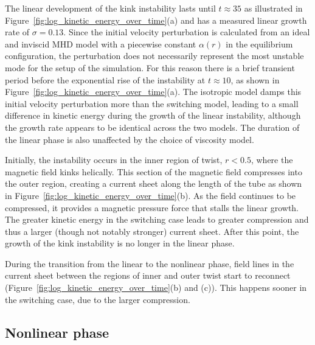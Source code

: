 The linear development of the kink instability lasts until $t\approx 35$ as illustrated in   Figure~\ref{fig:log_kinetic_energy_over_time}(a) and has a measured linear growth rate of $\sigma = 0.13$. Since the initial velocity perturbation is calculated from an ideal and inviscid MHD model with a piecewise constant $\alpha(r)$ in the equilibrium configuration, the perturbation does not necessarily represent the most unstable mode for the setup of the simulation. For this reason there is a brief transient period before the exponential rise of the instability at $t\approx10$, as shown in Figure~\ref{fig:log_kinetic_energy_over_time}(a). The isotropic model damps this initial velocity perturbation more than the switching model, leading to a small difference in kinetic energy during the growth of the linear instability, although the growth rate appears to be identical across the two models. The duration of the linear phase is also unaffected by the choice of viscosity model.

Initially, the instability occurs in the inner region of twist, $r<0.5$, where the magnetic field kinks helically. This section of the magnetic field compresses into the outer region, creating a current sheet along the length of the tube as shown in Figure~\ref{fig:log_kinetic_energy_over_time}(b). As the field continues to be compressed, it provides a magnetic pressure force that stalls the linear growth. The greater kinetic energy in the switching case leads to greater compression and thus a larger (though not notably stronger) current sheet. After this point, the growth of the kink instability is no longer in the linear phase.

During the transition from the linear to the nonlinear phase, field lines in the current sheet between the regions of inner and outer twist start to reconnect (Figure~\ref{fig:log_kinetic_energy_over_time}(b) and (c)). This happens sooner in the switching case, due to the larger compression.

\subsection{Nonlinear phase}

